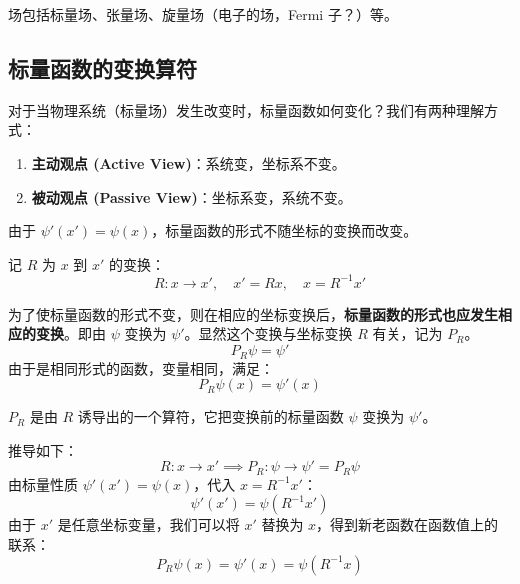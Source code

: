 \begin{note}
    场包括标量场、张量场、旋量场（电子的场，Fermi 子？）等。
\end{note}

\subsection{标量函数的变换算符}
对于当物理系统（标量场）发生改变时，标量函数如何变化？我们有两种理解方式：
\begin{enumerate}
    \item \textbf{主动观点 (Active View)}：系统变，坐标系不变。
    \item \textbf{被动观点 (Passive View)}：坐标系变，系统不变。
\end{enumerate}

% 
%

由于 $\psi'(x') = \psi(x)$，标量函数的形式不随坐标的变换而改变。

记 $R$ 为 $x$ 到 $x'$ 的变换：
\begin{equation}
    R: x \to x', \quad x' = Rx, \quad x = R^{-1}x'
\end{equation}

为了使标量函数的形式不变，则在相应的坐标变换后，\textbf{标量函数的形式也应发生相应的变换}。即由 $\psi$ 变换为 $\psi'$。显然这个变换与坐标变换 $R$ 有关，记为 $P_R$。
\begin{equation}
    P_R \psi = \psi'
\end{equation}
由于是相同形式的函数，变量相同，满足：
\begin{equation}
    P_R \psi(x) = \psi'(x)
\end{equation}

$P_R$ 是由 $R$ 诱导出的一个算符，它把变换前的标量函数 $\psi$ 变换为 $\psi'$。

推导如下：
\begin{equation}
    R: x \to x' \implies P_R: \psi \to \psi' = P_R \psi
\end{equation}
由标量性质 $\psi'(x') = \psi(x)$，代入 $x = R^{-1}x'$：
\begin{equation}
    \psi'(x') = \psi(R^{-1}x')
\end{equation}
由于 $x'$ 是任意坐标变量，我们可以将 $x'$ 替换为 $x$，得到新老函数在函数值上的联系：
\begin{equation}
    P_R \psi(x) = \psi'(x) = \psi(R^{-1}x)
\end{equation}

